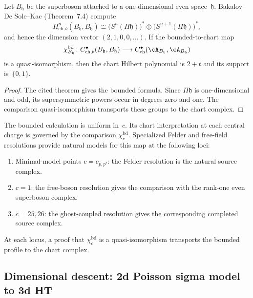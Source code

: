 \begin{proposition}
\label{prop:vol2-superboson-bounded-benchmark}
Let $B_{\mathfrak h}$ be the superboson attached to a one-dimensional
even space~$\mathfrak h$. Bakalov--De Sole--Kac
\cite{BDSK21} \textup{(}Theorem~7.4\textup{)} compute
\[
 H^n_{\mathrm{ch},b}(B_{\mathfrak h},B_{\mathfrak h})
 \cong
 \bigl(S^n(\Pi\mathfrak h)\bigr)^*
 \oplus
 \bigl(S^{n+1}(\Pi\mathfrak h)\bigr)^*,
\]
and hence the dimension vector $(2,1,0,0,\ldots)$.  If the
bounded-to-chart map
\[
 \chi^{\mathrm{bd}}_{B_{\mathfrak h}}\colon
 C^\bullet_{\mathrm{ch},b}(B_{\mathfrak h},B_{\mathfrak h})
 \longrightarrow
 C^\bullet_{\mathrm{ch}}(\cA_{B_{\mathfrak h}},
                         \cA_{B_{\mathfrak h}})
\]
is a quasi-isomorphism, then the chart Hilbert polynomial is $2+t$
and its support is~$\{0,1\}$.
\end{proposition}

\begin{proof}
The cited theorem gives the bounded formula. Since
$\Pi\mathfrak h$ is one-dimensional and odd, its supersymmetric
powers occur in degrees zero and one.  The comparison
quasi-isomorphism transports these groups to the chart complex.
\end{proof}

\begin{remark}
\label{rem:vir-concentration-exceptions}
The bounded calculation is uniform in~$c$.  Its chart interpretation
at each central charge is governed by the comparison
$\chi_c^{\mathrm{bd}}$.  Specialized Felder and free-field resolutions
provide natural models for this map at the following loci:
\begin{enumerate}[label=\textup{(\alph*)}]
\item Minimal-model points $c = c_{p,p'}$: the Felder resolution is
the natural source complex.
\item $c = 1$: the free-boson resolution gives the comparison with the
rank-one even superboson complex.
\item $c = 25,26$: the ghost-coupled resolution gives the corresponding
completed source complex.
\end{enumerate}
At each locus, a proof that $\chi_c^{\mathrm{bd}}$ is a
quasi-isomorphism transports the bounded profile to the chart complex.
\end{remark}

\subsection{Dimensional descent: 2d Poisson sigma model to 3d HT}

